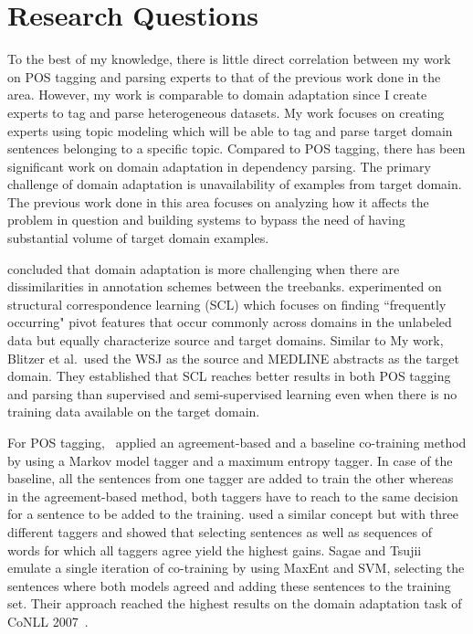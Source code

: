 \chapter{Research Questions}


To the best of my knowledge, there is little direct correlation between my work on POS tagging and parsing experts to that of the previous work done in the area.
However, my work is comparable to domain adaptation since I create experts to tag and parse heterogeneous datasets. %
My work focuses on creating experts using topic modeling which will be able to tag and parse target domain sentences belonging to a specific topic. Compared to POS tagging, there has been significant work on domain adaptation in dependency parsing.
The primary challenge of domain adaptation is unavailability of examples from target domain. The previous work done in this area focuses on analyzing how it affects the problem in question and building systems to bypass the need of having substantial volume of target domain examples.

\cite{dredze2007frustratingly} concluded that domain adaptation is more challenging when there are dissimilarities in annotation schemes between the treebanks.
\cite{blitzer:mcdonald:ea:06} experimented on structural correspondence learning (SCL) which focuses on finding ``frequently occurring" pivot features that occur commonly across domains in the unlabeled data but equally characterize source and target domains. Similar to My work, Blitzer et al.\ used the WSJ as the source and MEDLINE abstracts as the target domain. They established that SCL reaches better results in both POS tagging and parsing than supervised and semi-supervised learning even when there is no training data available on the target domain.

For POS tagging,~\cite{clark:curran:ea:03} applied an agreement-based and a baseline co-training method by using a Markov model tagger and a maximum entropy tagger. In case of the baseline, all the sentences from one tagger are added to train the other whereas in the agreement-based method, both taggers have to reach to the same decision for a sentence to be added to the training.
\cite{kuebler:baucom:11} used a similar concept but with three different taggers and showed that selecting sentences as well as sequences of words for which all taggers agree yield the highest gains.
Sagae and Tsujii~\cite{sagae2007dependency} emulate a single iteration of co-training by using MaxEnt and SVM, selecting the sentences where both models agreed and adding these sentences to the training set. Their approach reached the highest results on the domain adaptation task of CoNLL 2007~\cite{nilsson2007conll}.

